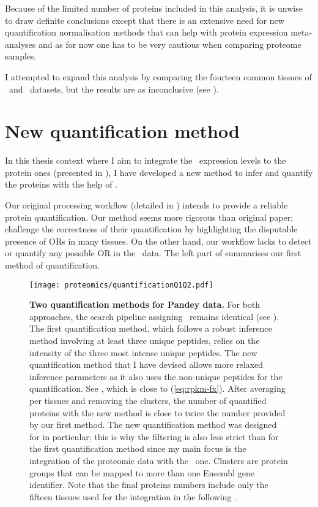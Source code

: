 Because of the limited number of proteins included in this analysis,
it is unwise to draw definite conclusions
except that there is an extensive need for new quantification normalisation methods
that can help with protein expression meta-analyses
and as for now one has to be very cautious when comparing proteome samples.

I attempted to expand this analysis by comparing the fourteen common tissues
of \pandey\ and \kuster\ datasets,
but the results are as inconclusive
(see ).

\section{New quantification method}\label{sec:NewQuantProt}

In this thesis context where I aim to integrate
the \mRNA\ expression levels to the protein ones
(presented in ),
I have developed a new method to infer and quantify the proteins
with the help of \james.

Our original processing workflow (detailed in )
intends to provide a reliable protein quantification.
Our method seems more rigorous than \citet{PandeyData} original paper;
\citet{Ezkurdia2014-qx} challenge the correctness of their quantification
by highlighting the disputable presence of \glspl{OR} in many tissues.
On the other hand, our workflow lacks to detect or quantify any possible \gls{OR}
in the \pandey\ data.
The left part of  summarises
our first method of quantification.

\begin{figure}[!htbp]
    \texttt{[image: proteomics/quantificationQ1Q2.pdf]}\centering
    \caption[Two quantification methods for Pandey data]{\label{fig:newQuantProtMeth}\textbf{Two
    quantification methods for Pandey data.}
    For both approaches, the search pipeline assigning \psms\ remains identical
    (see ).
    The first quantification method,
    which follows a robust inference method
    involving at least three unique peptides,
    relies on the intensity of the three most intense unique peptides.
    The new quantification method that I have devised
    allows more relaxed inference parameters
    as it also uses the non-unique peptides for the quantification.
    See ,
    which is close to  (\vref{eq:rpkm-fx}).
    After averaging per tissues and removing the clusters,
    the number of quantified proteins with the new method
    is close to twice the number provided by our first method.
    The new quantification method was designed for  in particular;
    this is why the filtering is also less strict than for the first quantification method
    since my main focus is the integration of the proteomic data with the \Rnaseq\ one.
    Clusters are protein groups that can be mapped to
    more than one \gls{Ensembl} gene identifier.
    Note that the final proteins numbers include only the fifteen tissues
    used for the integration in the following .
    }
\end{figure}

